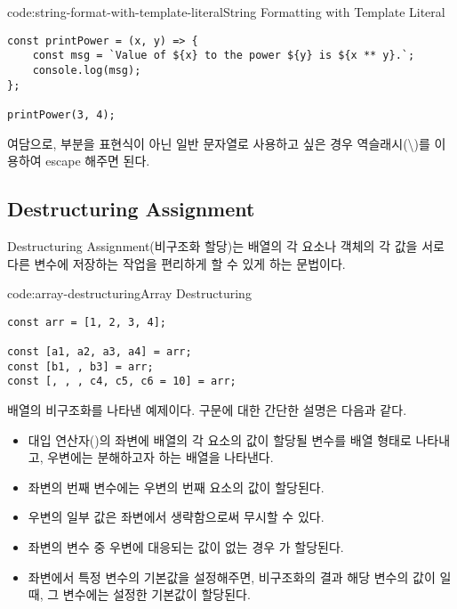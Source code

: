\begin{codeenv}{code:string-format-with-template-literal}{String Formatting with Template Literal}\begin{verbatim}
const printPower = (x, y) => {
    const msg = `Value of ${x} to the power ${y} is ${x ** y}.`;
    console.log(msg);
};

printPower(3, 4);
\end{verbatim}
\end{codeenv}

여담으로, \cd{\$\{\}} 부분을 표현식이 아닌 일반 문자열로 사용하고 싶은 경우 역슬래시(\cd\textbackslash)를 이용하여 escape 해주면 된다.
\clearpage

\subsection*{Destructuring Assignment}

Destructuring Assignment(비구조화 할당)는 배열의 각 요소나 객체의 각 값을 서로 다른 변수에 저장하는 작업을 편리하게 할 수 있게 하는 문법이다.

\begin{codeenv}{code:array-destructuring}{Array Destructuring}\begin{verbatim}
const arr = [1, 2, 3, 4];

const [a1, a2, a3, a4] = arr;
const [b1, , b3] = arr;
const [, , , c4, c5, c6 = 10] = arr;
\end{verbatim}
\end{codeenv}

\은 배열의 비구조화를 나타낸 예제이다. 구문에 대한 간단한 설명은 다음과 같다.

\begin{itemize}
    \item 대입 연산자(\cd{=})의 좌변에 배열의 각 요소의 값이 할당될 변수를 배열 형태로 나타내고, 우변에는 분해하고자 하는 배열을 나타낸다.
    \item 좌변의 번째 변수에는 우변의 번째 요소의 값이 할당된다.
    \item 우변의 일부 값은 좌변에서 생략함으로써 무시할 수 있다.
    \item 좌변의 변수 중 우변에 대응되는 값이 없는 경우 가 할당된다.
    \item 좌변에서 특정 변수의 기본값을 설정해주면, 비구조화의 결과 해당 변수의 값이 일 때, 그 변수에는 설정한 기본값이 할당된다.
\end{itemize}

